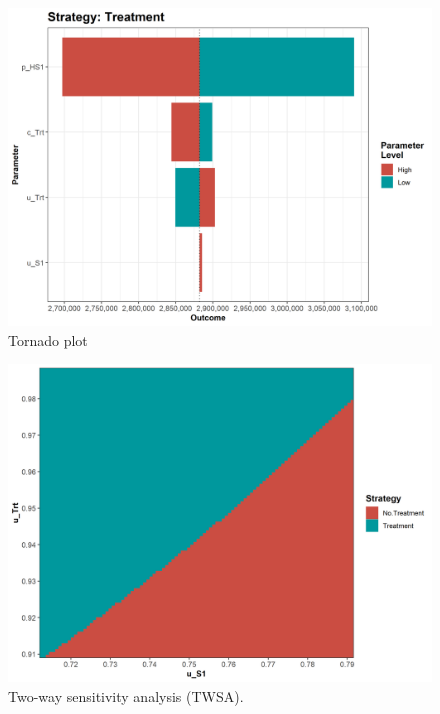 \documentclass[]{book}
\begin{document}
\begin{figure}

{\centering \includegraphics[width=1\linewidth]{../figs/05a_tornado_lrm_Treatment_nmb} 

}

\caption{Tornado plot}\label{fig:05a-tornado-lrm-Treatment-nmb}
\end{figure}

\begin{figure}

{\centering \includegraphics[width=1\linewidth]{../figs/05a_twsa_lrm_uS1_uTrt_nmb} 

}

\caption{Two-way sensitivity analysis (TWSA).}\label{fig:05a-twsa-lrm-uS1-uTrt-nmb}
\end{figure}
\end{document}
